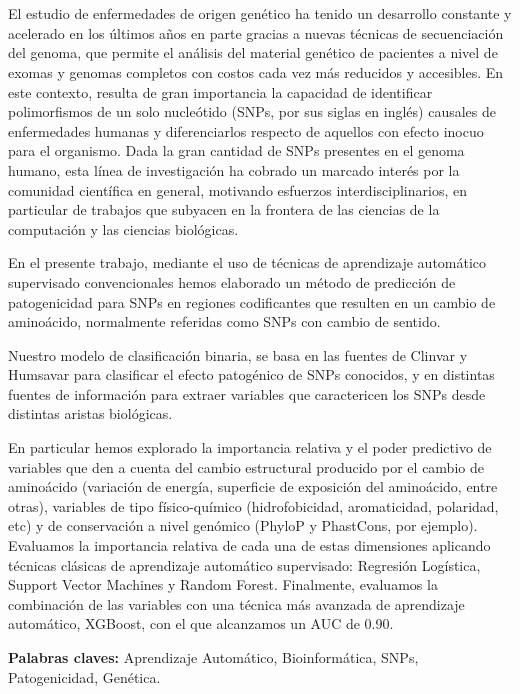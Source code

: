 \chapter*{\runtitulo}

\noindent El estudio de enfermedades de origen genético ha tenido un desarrollo constante y acelerado en los últimos años en parte gracias a nuevas técnicas de secuenciación del genoma, que permite el análisis del material genético de pacientes a nivel de exomas y genomas completos con costos cada vez más reducidos y accesibles. En este contexto, resulta de gran importancia la capacidad de identificar polimorfismos de un solo nucleótido (SNPs, por sus siglas en inglés) causales de enfermedades humanas y diferenciarlos respecto de aquellos con efecto inocuo para el organismo. Dada la gran cantidad de SNPs presentes en el genoma humano, esta línea de investigación ha cobrado un marcado interés por la comunidad científica en general, motivando esfuerzos interdisciplinarios, en particular de trabajos que subyacen en la frontera de las ciencias de la computación y las ciencias biológicas.

En el presente trabajo, mediante el uso de técnicas de aprendizaje automático supervisado convencionales hemos elaborado un método de predicción de patogenicidad para SNPs en regiones codificantes que resulten en un cambio de aminoácido, normalmente referidas como SNPs con cambio de sentido.

Nuestro modelo de clasificación binaria, se basa en las fuentes de Clinvar y Humsavar para clasificar el efecto patogénico de SNPs conocidos, y en distintas fuentes de información para extraer variables que caractericen los SNPs desde distintas aristas biológicas.
 
En particular hemos explorado la importancia relativa y el poder predictivo de variables que den a cuenta del cambio estructural producido por el cambio de aminoácido (variación de energía, superficie de exposición del aminoácido, entre otras), variables de tipo físico-químico (hidrofobicidad, aromaticidad, polaridad, etc) y de conservación a nivel genómico (PhyloP y PhastCons, por ejemplo). Evaluamos la importancia relativa de cada una de estas dimensiones aplicando técnicas clásicas de aprendizaje automático supervisado: Regresión Logística, Support Vector Machines y Random Forest. Finalmente, evaluamos la combinación de las variables con una técnica más avanzada de aprendizaje automático, XGBoost, con el que alcanzamos un AUC de 0.90.



\bigskip

\noindent\textbf{Palabras claves:} Aprendizaje Automático, Bioinformática, SNPs, Patogenicidad, Genética.



